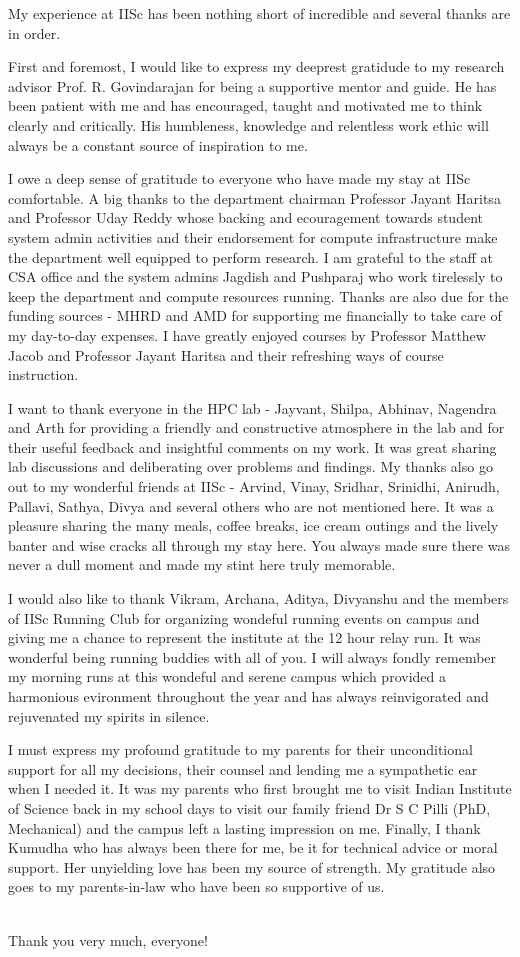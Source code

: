 My experience at IISc has been nothing short of incredible and several thanks are in order.
\par First and foremost, I would like to express my deeprest gratidude to my research advisor Prof. R. Govindarajan for being a supportive mentor and guide. He has been patient with me and has encouraged, taught and motivated me to think clearly and critically. His humbleness, knowledge and relentless work ethic will always be a constant source of inspiration to me.
\par I owe a deep sense of gratitude to everyone who have made my stay at IISc comfortable. A big thanks to the department chairman Professor Jayant Haritsa and Professor Uday Reddy whose backing and ecouragement towards student system admin activities and their endorsement for compute infrastructure make the department well equipped to perform research. I am grateful to the staff at CSA office and the system admins Jagdish and Pushparaj who work tirelessly to keep the department and compute resources running. Thanks are also due for the funding sources - MHRD and AMD for supporting me financially to take care of my day-to-day expenses. I have greatly enjoyed courses by Professor Matthew Jacob and Professor Jayant Haritsa and their refreshing ways of course instruction.
\par I want to thank everyone in the HPC lab - Jayvant, Shilpa, Abhinav, Nagendra and Arth for providing a friendly and constructive atmosphere in the lab and for their useful feedback and insightful comments on my work. It was great sharing lab discussions and deliberating over problems and findings. My thanks also go out to my wonderful friends at IISc - Arvind, Vinay, Sridhar, Srinidhi, Anirudh, Pallavi, Sathya, Divya and several others who are not mentioned here. It was a pleasure sharing the many meals, coffee breaks, ice cream outings and the lively banter and wise cracks all through my stay here. You always made sure there was never a dull moment and made my stint here truly memorable.
\par I would also like to thank Vikram, Archana, Aditya, Divyanshu and the members of IISc Running Club for organizing wondeful running events on campus and giving me a chance to represent the institute at the 12 hour relay run. It was wonderful being running buddies with all of you. I will always fondly remember my morning runs at this wondeful and serene campus which provided a harmonious evironment throughout the year and has always reinvigorated and rejuvenated my spirits in silence.
\par I must express my profound gratitude to my parents for their unconditional support for all my decisions, their counsel and lending me a sympathetic ear when I needed it. It was my parents who first brought me to visit Indian Institute of Science back in my school days to visit our family friend Dr S C Pilli (PhD, Mechanical) and the campus left a lasting impression on me. Finally, I thank Kumudha who has always been there for me, be it for technical advice or moral support. Her unyielding love has been my source of strength. My gratitude also goes to my parents-in-law who have been so supportive of us.\\
\\
\par Thank you very much, everyone!